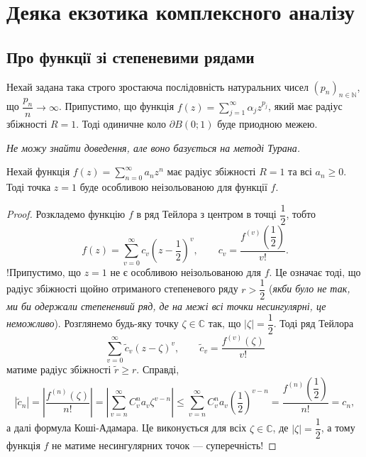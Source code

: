\documentclass{math_library}
\begin{document}
\newpage
\section{Деяка екзотика комплексного аналізу}
\subsection{Про функції зі степеневими рядами}
\begin{theorem}
Нехай задана така строго зростаюча послідовність натуральних чисел $(p_n)_{n \in \mathbb{N}}$, що $\dfrac{p_n}{n} \to \infty$. Припустимо, що функція $f(z) = \displaystyle\sum_{j=1}^\infty \alpha_j z^{p_j}$, який має радіус збіжності $R = 1$. Тоді одиничне коло $\partial B(0;1)$ буде приодною межею.
\end{theorem}

\textit{Не можу знайти доведення, але воно базується на методі Турана.}

\begin{theorem}
Нехай функція $f(z) = \displaystyle\sum_{n=0}^\infty a_n z^n$ має радіус збіжності $R = 1$ та всі $a_n \geq 0$. Тоді точка $z = 1$ буде особливою неізольованою для функції $f$.
\end{theorem}

\begin{proof}
Розкладемо функцію $f$ в ряд Тейлора з центром в точці $\dfrac{1}{2}$, тобто
\[
f(z) = \sum_{v=0}^\infty c_v \left(z - \dfrac{1}{2} \right)^v, \qquad c_v = \dfrac{f^{(v)}\left(\dfrac{1}{2} \right)}{v!}.
\]
!Припустимо, що $z=1$ не є особливою неізольованою для $f$. Це означає тоді, що радіус збіжності щойно отриманого степеневого ряду $r > \dfrac{1}{2}$ (\textit{якби було не так, ми би одержали степененвий ряд, де на межі всі точки несингулярні, це неможливо}). Розглянемо будь-яку точку $\zeta \in \mathbb{C}$ так, що $|\zeta| = \dfrac{1}{2}$. Тоді ряд Тейлора
\[
\sum_{v=0}^\infty \tilde{c}_v (z-\zeta)^v, \qquad \tilde{c}_v = \dfrac{f^{(v)}(\zeta)}{v!}
\]
матиме радіус збіжності $\tilde{r} \geq r$. Справді,
\[
 |\tilde{c}_n| = \left| \dfrac{f^{(n)}(\zeta)}{n!} \right| = \left| \sum_{v=n}^\infty C_v^n a_v \zeta^{v-n} \right| \leq \sum_{v=n}^\infty C_v^n a_v \left( \dfrac{1}{2} \right)^{v-n} = \dfrac{f^{(n)}\left( \dfrac{1}{2} \right) }{n!} = c_n,
\]
а далі формула Коші-Адамара. Це виконується для всіх $\zeta \in \mathbb{C}$, де $|\zeta| = \dfrac{1}{2}$, а тому функція $f$ не матиме несингулярних точок --- суперечність!
\end{proof}
\end{document}
